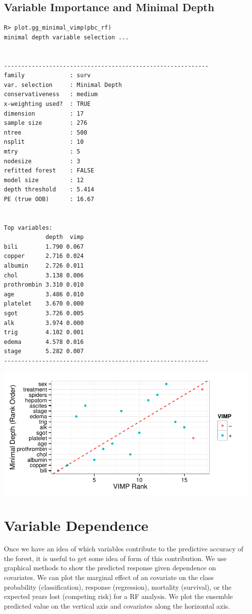 \documentclass[nojss,letterpaper]{jss}\usepackage[]{graphicx}\usepackage[]{color}
\makeatletter
\def\maxwidth{ %
  \ifdim\Gin@nat@width>\linewidth
    \linewidth
  \else
    \Gin@nat@width
  \fi
}
\newenvironment{kframe}{%
 \def\at@end@of@kframe{}%
 \ifinner\ifhmode%
  \def\at@end@of@kframe{\end{minipage}}%
  \begin{minipage}{\columnwidth}%
 \fi\fi%
 \def\FrameCommand##1{\hskip\@totalleftmargin \hskip-\fboxsep
 \colorbox{shadecolor}{##1}\hskip-\fboxsep
     \hskip-\linewidth \hskip-\@totalleftmargin \hskip\columnwidth}%
 \MakeFramed {\advance\hsize-\width
   \@totalleftmargin\z@ \linewidth\hsize
   \@setminipage}}%
 {\par\unskip\endMakeFramed%
 \at@end@of@kframe}
\newenvironment{knitrout}{}{} %
\makeatother
\begin{document}
\subsection{Variable Importance and Minimal Depth}
\begin{knitrout}\footnotesize
{}\color{fgcolor}\begin{kframe}
\begin{verbatim}
R> plot.gg_minimal_vimp(pbc_rf)
minimal depth variable selection ...


-----------------------------------------------------------
family             : surv 
var. selection     : Minimal Depth 
conservativeness   : medium 
x-weighting used?  : TRUE 
dimension          : 17 
sample size        : 276 
ntree              : 500 
nsplit             : 10 
mtry               : 5 
nodesize           : 3 
refitted forest    : FALSE 
model size         : 12 
depth threshold    : 5.414 
PE (true OOB)      : 16.67 


Top variables:
            depth  vimp
bili        1.790 0.067
copper      2.716 0.024
albumin     2.726 0.011
chol        3.138 0.006
prothrombin 3.310 0.010
age         3.486 0.010
platelet    3.670 0.000
sgot        3.726 0.005
alk         3.974 0.000
trig        4.102 0.001
edema       4.578 0.016
stage       5.282 0.007
-----------------------------------------------------------
\end{verbatim}
\end{kframe}

{\centering \includegraphics[width=\maxwidth]{figure/vig-pbc-minvimp-1} 

}



\end{knitrout}


\section{Variable Dependence}\label{S:dependence}
Once we have an idea of which variables contribute to the predictive accuracy of the forest, it is useful to get some idea of form of this contribution. We use graphical methods to show the predicted response given dependence on covariates. We can plot the marginal effect of an covariate on the class probability (classification), response (regression), mortality (survival), or the expected years lost (competing risk) for a RF analysis. We plot the ensemble predicted value on the vertical axis and covariates along the horizontal axis.
\end{document}
